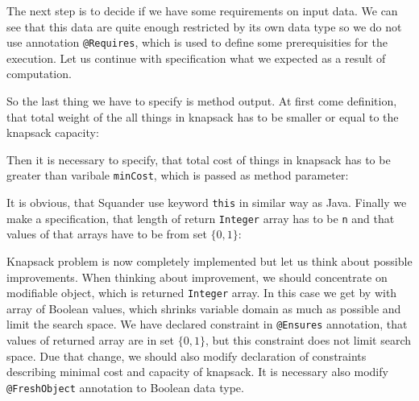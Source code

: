 \documentclass[11pt,twoside,a4paper]{book}
\begin{document}


The next step is to decide if we have some requirements on input data. We can
see that this data are quite enough restricted by its own data type so we do not
use annotation \verb|@Requires|, which is used to define some prerequisities for
the execution. Let us continue with specification what we expected as a result
of computation. 

So the last thing we have to specify is method output. At first come definition,
that total weight of the all things in knapsack has to be smaller or equal to
the knapsack capacity:



Then it is necessary to specify, that total cost of things in knapsack has to be
greater than varibale \verb|minCost|, which is passed as method parameter:



It is obvious, that Squander use keyword \verb|this| in similar way as Java.
Finally we make a specification, that length of return \verb|Integer| array has
to be \verb|n| and that values of that arrays have to be from set $\{0, 1\}$:



Knapsack problem is now completely implemented but let us think about possible
improvements. When thinking about improvement, we should concentrate on
modifiable object, which is returned \verb|Integer| array. In this case we get
by with array of Boolean values, which shrinks variable domain as much as possible
and limit the search space. We have declared constraint in \verb|@Ensures|
annotation, that values of returned array are in set $\{0, 1\}$, but this
constraint does not limit search space. Due that change, we should also modify
declaration of constraints describing minimal cost and capacity of knapsack. It
is necessary also modify \verb|@FreshObject| annotation to Boolean data type.
\newpage

\end{document}
